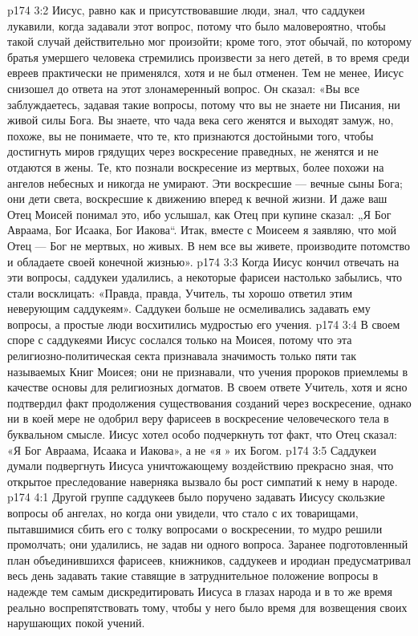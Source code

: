 \vs p174 3:2 Иисус, равно как и присутствовавшие люди, знал, что саддукеи лукавили, когда задавали этот вопрос, потому что было маловероятно, чтобы такой случай действительно мог произойти; кроме того, этот обычай, по которому братья умершего человека стремились произвести за него детей, в то время среди евреев практически не применялся, хотя и не был отменен. Тем не менее, Иисус снизошел до ответа на этот злонамеренный вопрос. Он сказал: «Вы все заблуждаетесь, задавая такие вопросы, потому что вы не знаете ни Писания, ни живой силы Бога. Вы знаете, что чада века сего женятся и выходят замуж, но, похоже, вы не понимаете, что те, кто признаются достойными того, чтобы достигнуть миров грядущих через воскресение праведных, не женятся и не отдаются в жены. Те, кто познали воскресение из мертвых, более похожи на ангелов небесных и никогда не умирают. Эти воскресшие --- вечные сыны Бога; они дети света, воскресшие к движению вперед к вечной жизни. И даже ваш Отец Моисей понимал это, ибо услышал, как Отец при купине сказал: „Я  Бог Авраама, Бог Исаака, Бог Иакова“. Итак, вместе с Моисеем я заявляю, что мой Отец --- Бог не мертвых, но живых. В нем все вы живете, производите потомство и обладаете своей конечной жизнью».
\vs p174 3:3 Когда Иисус кончил отвечать на эти вопросы, саддукеи удалились, а некоторые фарисеи настолько забылись, что стали восклицать: «Правда, правда, Учитель, ты хорошо ответил этим неверующим саддукеям». Саддукеи больше не осмеливались задавать ему вопросы, а простые люди восхитились мудростью его учения.
\vs p174 3:4 \pc В своем споре с саддукеями Иисус сослался только на Моисея, потому что эта религиозно\hyp{}политическая секта признавала значимость только пяти так называемых Книг Моисея; они не признавали, что учения пророков приемлемы в качестве основы для религиозных догматов. В своем ответе Учитель, хотя и ясно подтвердил факт продолжения существования созданий через воскресение, однако ни в коей мере не одобрил веру фарисеев в воскресение человеческого тела в буквальном смысле. Иисус хотел особо подчеркнуть тот факт, что Отец сказал: «Я  Бог Авраама, Исаака и Иакова», а не «я » их Богом.
\vs p174 3:5 Саддукеи думали подвергнуть Иисуса уничтожающему воздействию  прекрасно зная, что открытое преследование наверняка вызвало бы рост симпатий к нему в народе.
\vs p174 4:1 Другой группе саддукеев было поручено задавать Иисусу скользкие вопросы об ангелах, но когда они увидели, что стало с их товарищами, пытавшимися сбить его с толку вопросами о воскресении, то мудро решили промолчать; они удалились, не задав ни одного вопроса. Заранее подготовленный план объединившихся фарисеев, книжников, саддукеев и иродиан предусматривал весь день задавать такие ставящие в затруднительное положение вопросы в надежде тем самым дискредитировать Иисуса в глазах народа и в то же время реально воспрепятствовать тому, чтобы у него было время для возвещения своих нарушающих покой учений.
